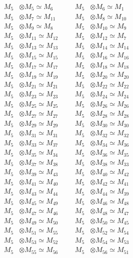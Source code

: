 \begin{align*}
M_{5} &\otimes M_{5} \simeq M_{6} &&& M_{5} &\otimes M_{6} \simeq M_{1}\\
M_{5} &\otimes M_{7} \simeq M_{11} &&& M_{5} &\otimes M_{8} \simeq M_{10}\\
M_{5} &\otimes M_{9} \simeq M_{8} &&& M_{5} &\otimes M_{10} \simeq M_{9}\\
M_{5} &\otimes M_{11} \simeq M_{12} &&& M_{5} &\otimes M_{12} \simeq M_{7}\\
M_{5} &\otimes M_{13} \simeq M_{13} &&& M_{5} &\otimes M_{14} \simeq M_{14}\\
M_{5} &\otimes M_{15} \simeq M_{15} &&& M_{5} &\otimes M_{16} \simeq M_{16}\\
M_{5} &\otimes M_{17} \simeq M_{17} &&& M_{5} &\otimes M_{18} \simeq M_{18}\\
M_{5} &\otimes M_{19} \simeq M_{19} &&& M_{5} &\otimes M_{20} \simeq M_{20}\\
M_{5} &\otimes M_{21} \simeq M_{21} &&& M_{5} &\otimes M_{22} \simeq M_{22}\\
M_{5} &\otimes M_{23} \simeq M_{23} &&& M_{5} &\otimes M_{24} \simeq M_{24}\\
M_{5} &\otimes M_{25} \simeq M_{25} &&& M_{5} &\otimes M_{26} \simeq M_{26}\\
M_{5} &\otimes M_{27} \simeq M_{27} &&& M_{5} &\otimes M_{28} \simeq M_{28}\\
M_{5} &\otimes M_{29} \simeq M_{29} &&& M_{5} &\otimes M_{30} \simeq M_{30}\\
M_{5} &\otimes M_{31} \simeq M_{31} &&& M_{5} &\otimes M_{32} \simeq M_{32}\\
M_{5} &\otimes M_{33} \simeq M_{37} &&& M_{5} &\otimes M_{34} \simeq M_{36}\\
M_{5} &\otimes M_{35} \simeq M_{34} &&& M_{5} &\otimes M_{36} \simeq M_{35}\\
M_{5} &\otimes M_{37} \simeq M_{38} &&& M_{5} &\otimes M_{38} \simeq M_{33}\\
M_{5} &\otimes M_{39} \simeq M_{43} &&& M_{5} &\otimes M_{40} \simeq M_{42}\\
M_{5} &\otimes M_{41} \simeq M_{40} &&& M_{5} &\otimes M_{42} \simeq M_{41}\\
M_{5} &\otimes M_{43} \simeq M_{44} &&& M_{5} &\otimes M_{44} \simeq M_{39}\\
M_{5} &\otimes M_{45} \simeq M_{49} &&& M_{5} &\otimes M_{46} \simeq M_{48}\\
M_{5} &\otimes M_{47} \simeq M_{46} &&& M_{5} &\otimes M_{48} \simeq M_{47}\\
M_{5} &\otimes M_{49} \simeq M_{50} &&& M_{5} &\otimes M_{50} \simeq M_{45}\\
M_{5} &\otimes M_{51} \simeq M_{55} &&& M_{5} &\otimes M_{52} \simeq M_{54}\\
M_{5} &\otimes M_{53} \simeq M_{52} &&& M_{5} &\otimes M_{54} \simeq M_{53}\\
M_{5} &\otimes M_{55} \simeq M_{56} &&& M_{5} &\otimes M_{56} \simeq M_{51}\\
\end{align*}

